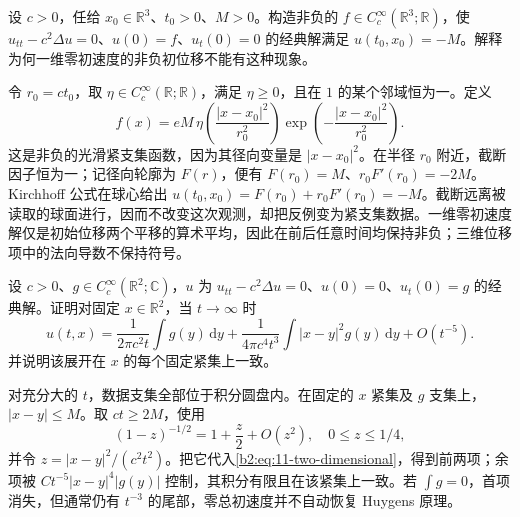 \begin{exercise}\label{b2:ex:11-positivity-failure}
设 \(c>0\)，任给 \(x_0\in\mathbb R^3\)、\(t_0>0\)、\(M>0\)。构造非负的 \(f\in C_c^\infty(\mathbb R^3;\mathbb R)\)，使 \(u_{tt}-c^2\Delta u=0\)、\(u(0)=f\)、\(u_t(0)=0\) 的经典解满足 \(u(t_0,x_0)=-M\)。解释为何一维零初速度的非负初位移不能有这种现象。
\end{exercise}
\begin{solution}
令 \(r_0=ct_0\)，取 \(\eta\in C_c^\infty(\mathbb R;\mathbb R)\)，满足 \(\eta\geq0\)，且在 \(1\) 的某个邻域恒为一。定义
\[
 f(x)=eM\,\eta\left(\frac{|x-x_0|^2}{r_0^2}\right)
             \exp\left(-\frac{|x-x_0|^2}{r_0^2}\right).
\]
这是非负的光滑紧支集函数，因为其径向变量是 \(|x-x_0|^2\)。在半径 \(r_0\) 附近，截断因子恒为一；记径向轮廓为 \(F(r)\)，便有 \(F(r_0)=M\)、\(r_0F'(r_0)=-2M\)。Kirchhoff 公式在球心给出 \(u(t_0,x_0)=F(r_0)+r_0F'(r_0)=-M\)。截断远离被读取的球面进行，因而不改变这次观测，却把反例变为紧支集数据。一维零初速度解仅是初始位移两个平移的算术平均，因此在前后任意时间均保持非负；三维位移项中的法向导数不保持符号。
\end{solution}

\begin{exercise}\label{b2:ex:11-two-dimensional-tail}
设 \(c>0\)、\(g\in C_c^\infty(\mathbb R^2;\mathbb C)\)，\(u\) 为 \(u_{tt}-c^2\Delta u=0\)、\(u(0)=0\)、\(u_t(0)=g\) 的经典解。证明对固定 \(x\in\mathbb R^2\)，当 \(t\to\infty\) 时
\[
 u(t,x)=\dfrac1{2\pi c^2t}\int g(y)\,\mathrm{d}y
 +\dfrac1{4\pi c^4t^3}\int|x-y|^2g(y)\,\mathrm{d}y+O(t^{-5}).
\]
并说明该展开在 \(x\) 的每个固定紧集上一致。
\end{exercise}
\begin{solution}
对充分大的 \(t\)，数据支集全部位于积分圆盘内。在固定的 \(x\) 紧集及 \(g\) 支集上，\(|x-y|\leq M\)。取 \(ct\geq2M\)，使用
\[
 (1-z)^{-1/2}=1+\dfrac z2+O(z^2),\quad 0\leq z\leq1/4,
\]
并令 \(z=|x-y|^2/(c^2t^2)\)。把它代入\eqref{b2:eq:11-two-dimensional}，得到前两项；余项被 \(Ct^{-5}|x-y|^4|g(y)|\) 控制，其积分有限且在该紧集上一致。若 \(\int g=0\)，首项消失，但通常仍有 \(t^{-3}\) 的尾部，零总初速度并不自动恢复 Huygens 原理。
\end{solution}

